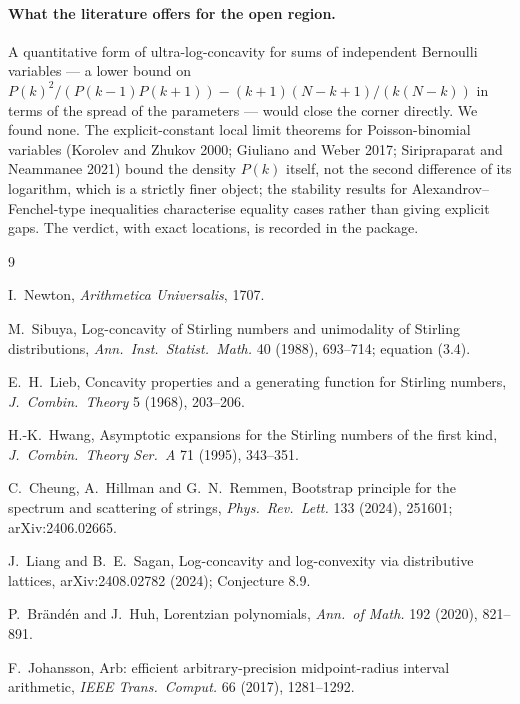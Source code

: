 \documentclass[12pt]{article}
\begin{document}
\paragraph{What the literature offers for the open region.}
A quantitative form of ultra-log-concavity for sums of independent Bernoulli variables --- a lower bound on $P(k)^2/(P(k-1)P(k+1)) - (k+1)(N-k+1)/(k(N-k))$ in terms of the spread of the parameters --- would close the corner directly. We found none. The explicit-constant local limit theorems for Poisson-binomial variables (Korolev and Zhukov 2000; Giuliano and Weber 2017; Siripraparat and Neammanee 2021) bound the density $P(k)$ itself, not the second difference of its logarithm, which is a strictly finer object; the stability results for Alexandrov--Fenchel-type inequalities characterise equality cases rather than giving explicit gaps. The verdict, with exact locations, is recorded in the package.

\begin{thebibliography}{9}

 I.~Newton, \emph{Arithmetica Universalis}, 1707.

 M.~Sibuya, Log-concavity of Stirling numbers and unimodality of Stirling distributions, \emph{Ann.\ Inst.\ Statist.\ Math.} 40 (1988), 693--714; equation (3.4).

 E.~H.~Lieb, Concavity properties and a generating function for Stirling numbers, \emph{J.\ Combin.\ Theory} 5 (1968), 203--206.

 H.-K.~Hwang, Asymptotic expansions for the Stirling numbers of the first kind, \emph{J.\ Combin.\ Theory Ser.\ A} 71 (1995), 343--351.

 C.~Cheung, A.~Hillman and G.~N.~Remmen, Bootstrap principle for the spectrum and scattering of strings, \emph{Phys.\ Rev.\ Lett.} 133 (2024), 251601; arXiv:2406.02665.

 J.~Liang and B.~E.~Sagan, Log-concavity and log-convexity via distributive lattices, arXiv:2408.02782 (2024); Conjecture 8.9.

 P.~Br\"and\'en and J.~Huh, Lorentzian polynomials, \emph{Ann.\ of Math.} 192 (2020), 821--891.

 F.~Johansson, Arb: efficient arbitrary-precision midpoint-radius interval arithmetic, \emph{IEEE Trans.\ Comput.} 66 (2017), 1281--1292.

\end{thebibliography}
\end{document}
